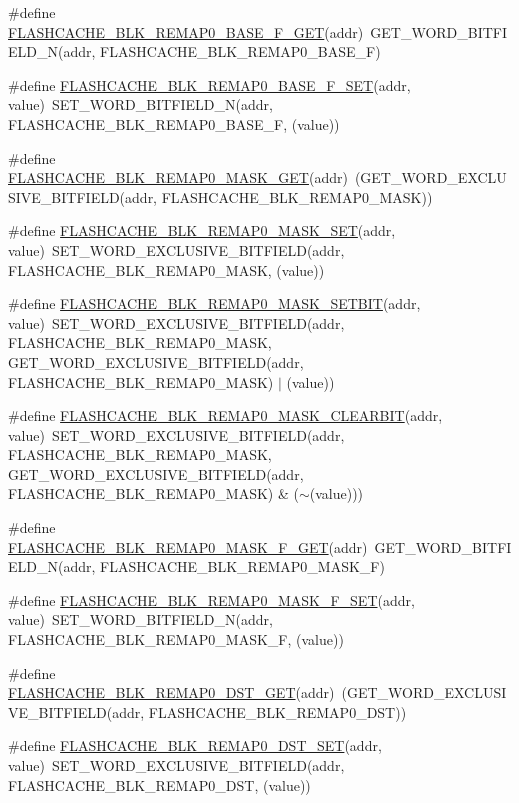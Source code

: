 \begin{DoxyCompactItemize}
\item 
\#define \hyperlink{a00549_a2156b4d647a0b488ec18e2cdab290865}{FLASHCACHE\_\-BLK\_\-REMAP0\_\-BASE\_\-F\_\-GET}(addr)~GET\_\-WORD\_\-BITFIELD\_\-N(addr, FLASHCACHE\_\-BLK\_\-REMAP0\_\-BASE\_\-F)
\item 
\#define \hyperlink{a00549_af89eee16c8027398820d1e9efa39f188}{FLASHCACHE\_\-BLK\_\-REMAP0\_\-BASE\_\-F\_\-SET}(addr, value)~SET\_\-WORD\_\-BITFIELD\_\-N(addr, FLASHCACHE\_\-BLK\_\-REMAP0\_\-BASE\_\-F, (value))
\item 
\#define \hyperlink{a00549_a760bb5f3552571fb399a39140715e19b}{FLASHCACHE\_\-BLK\_\-REMAP0\_\-MASK\_\-GET}(addr)~(GET\_\-WORD\_\-EXCLUSIVE\_\-BITFIELD(addr, FLASHCACHE\_\-BLK\_\-REMAP0\_\-MASK))
\item 
\#define \hyperlink{a00549_a1c18d544a99756acc68738ba971416b2}{FLASHCACHE\_\-BLK\_\-REMAP0\_\-MASK\_\-SET}(addr, value)~SET\_\-WORD\_\-EXCLUSIVE\_\-BITFIELD(addr, FLASHCACHE\_\-BLK\_\-REMAP0\_\-MASK, (value))
\item 
\#define \hyperlink{a00549_a2eedb77bb499b6cdf673b49999714cf9}{FLASHCACHE\_\-BLK\_\-REMAP0\_\-MASK\_\-SETBIT}(addr, value)~SET\_\-WORD\_\-EXCLUSIVE\_\-BITFIELD(addr, FLASHCACHE\_\-BLK\_\-REMAP0\_\-MASK, GET\_\-WORD\_\-EXCLUSIVE\_\-BITFIELD(addr, FLASHCACHE\_\-BLK\_\-REMAP0\_\-MASK) $|$ (value))
\item 
\#define \hyperlink{a00549_a853e3d32717c4414f65c967d2aa41ae9}{FLASHCACHE\_\-BLK\_\-REMAP0\_\-MASK\_\-CLEARBIT}(addr, value)~SET\_\-WORD\_\-EXCLUSIVE\_\-BITFIELD(addr, FLASHCACHE\_\-BLK\_\-REMAP0\_\-MASK, GET\_\-WORD\_\-EXCLUSIVE\_\-BITFIELD(addr, FLASHCACHE\_\-BLK\_\-REMAP0\_\-MASK) \& ($\sim$(value)))
\item 
\#define \hyperlink{a00549_a6736f08514c4485a1829736d527cd6f6}{FLASHCACHE\_\-BLK\_\-REMAP0\_\-MASK\_\-F\_\-GET}(addr)~GET\_\-WORD\_\-BITFIELD\_\-N(addr, FLASHCACHE\_\-BLK\_\-REMAP0\_\-MASK\_\-F)
\item 
\#define \hyperlink{a00549_a1a0f9b654e98346ce2e849dac052b074}{FLASHCACHE\_\-BLK\_\-REMAP0\_\-MASK\_\-F\_\-SET}(addr, value)~SET\_\-WORD\_\-BITFIELD\_\-N(addr, FLASHCACHE\_\-BLK\_\-REMAP0\_\-MASK\_\-F, (value))
\item 
\#define \hyperlink{a00549_abcde45536d763d7d802da81415e88fe8}{FLASHCACHE\_\-BLK\_\-REMAP0\_\-DST\_\-GET}(addr)~(GET\_\-WORD\_\-EXCLUSIVE\_\-BITFIELD(addr, FLASHCACHE\_\-BLK\_\-REMAP0\_\-DST))
\item 
\#define \hyperlink{a00549_ad0ca4a8e8b0b268f538c47b8d747bea9}{FLASHCACHE\_\-BLK\_\-REMAP0\_\-DST\_\-SET}(addr, value)~SET\_\-WORD\_\-EXCLUSIVE\_\-BITFIELD(addr, FLASHCACHE\_\-BLK\_\-REMAP0\_\-DST, (value))

\end{DoxyCompactItemize}
